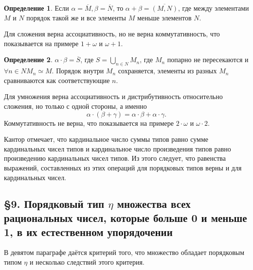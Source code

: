 \documentclass[a4paper,12pt]{extarticle}
\theoremstyle{definition}
\newtheorem{definition}{Определение}
\begin{document}
\begin{definition}
    Если $\alpha = \overline{M}, \beta = \overline{N}$, то $\alpha + \beta = \overline{(M, N)}$, где между элементами $M$ и $N$ порядок такой же и все элементы $M$ меньше элементов $N$.
\end{definition}
Для сложения верна ассоциативность, но не верна коммутативность, что показывается на примере $1 + \omega$ и $\omega + 1$.
\begin{definition}
    $\alpha \cdot \beta = \overline{S}$, где $S = \bigcup\limits_{n \in N}M_n$, где $M_n$ попарно не пересекаются и $\forall n \in N M_n \simeq M$.
    Порядок внутри $M_n$ сохраняется, элементы из разных $M_n$ сравниваются как соответствующие $n$.
\end{definition}
Для умножения верна ассоциативность и дистрибутивность относительно сложения, но только с одной стороны, а именно $$\alpha \cdot (\beta + \gamma) = \alpha \cdot \beta + \alpha \cdot \gamma.$$
Коммутативность не верна, что показывается на примере $2 \cdot \omega$ и $\omega \cdot 2$.

Кантор отмечает, что кардинальное число суммы типов равно сумме кардинальных чисел типов и кардинальное число произведения типов равно произведению кардинальных чисел типов.
Из этого следует, что равенства выражений, составленных из этих операций для порядковых типов верны и для кардинальных чисел.

\subsection{\S 9. Порядковый тип $\eta$ множества всех рациональных чисел, которые больше 0 и меньше 1, в их естественном упорядочении}
В девятом параграфе даётся критерий того, что множество обладает порядковым типом $\eta$ и несколько следствий этого критерия.
\end{document}

